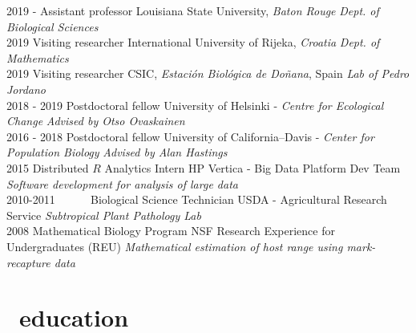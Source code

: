\documentclass[]{CV}
\begin{document}
\begin{entrylist}

  \entry
    {2019 - }
    {Assistant professor}
    {Louisiana State University, \textit{Baton Rouge}}
    {\emph{Dept. of Biological Sciences}} \\


  \entry
    {2019}
    {Visiting researcher}
    {International University of Rijeka, \textit{Croatia}}
    {\emph{Dept. of Mathematics}} \\

  \entry
    {2019}
    {Visiting researcher}
    {CSIC, \textit{Estación Biológica de Do\~nana}, Spain}
    {\emph{Lab of Pedro Jordano}} \\

  \entry
    {2018 - 2019}
    {Postdoctoral fellow}
    {University of Helsinki - \textit{Centre for Ecological Change}}
    {\emph{Advised by Otso Ovaskainen}} \\


  \entry
    {2016 - 2018}
		{Postdoctoral fellow}
    {University of California--Davis - \textit{Center for Population Biology}}
    {\emph{Advised by Alan Hastings}} \\


  \entry
    {2015}
    {Distributed $R$ Analytics Intern}
    {HP Vertica - Big Data Platform Dev Team}
    {\emph{Software development for analysis of large data}} \\

  \entry
    {2010-2011 \ \ \ \ \ }
    {Biological Science Technician}
    {USDA - Agricultural Research Service}
    {\emph{Subtropical Plant Pathology Lab }} \\

  \entry
    {2008}
    {Mathematical Biology Program}
    {NSF Research Experience for Undergraduates (REU)}
    {\emph{Mathematical estimation of host range using mark-recapture data}}
\end{entrylist}







\section{\faGraduationCap \  education}
\end{document}

